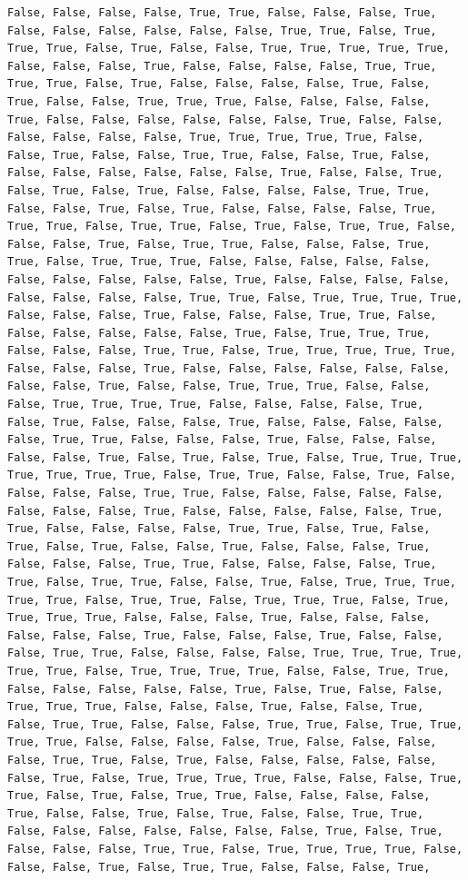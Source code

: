 \documentclass[
  letterpaper,
  DIV=11,
  numbers=noendperiod]{scrartcl}
\begin{document}
\begin{verbatim}
False, False, False, False, True, True, False, False, False, True, False, False, False, False, False, False, True, True, False, True, True, True, False, True, False, False, True, True, True, True, True, False, False, False, True, False, False, False, False, True, True, True, True, False, True, False, False, False, False, True, False, True, False, False, True, True, True, False, False, False, False, True, False, False, False, False, False, False, True, False, False, False, False, False, False, True, True, True, True, True, False, False, True, False, False, True, True, False, False, True, False, False, False, False, False, False, False, True, False, False, True, False, True, False, True, False, False, False, False, True, True, False, False, True, False, True, False, False, False, False, True, True, True, False, True, True, False, True, False, True, True, False, False, False, True, False, True, True, False, False, False, True, True, False, True, True, True, False, False, False, False, False, False, False, False, False, False, True, False, False, False, False, False, False, False, False, True, True, False, True, True, True, True, False, False, False, True, False, False, False, True, True, False, False, False, False, False, False, True, False, True, True, True, False, False, False, True, True, False, True, True, True, True, True, False, False, False, True, False, False, False, False, False, False, False, False, True, False, False, True, True, True, False, False, False, True, True, True, True, False, False, False, False, True, False, True, False, False, False, True, False, False, False, False, False, True, True, False, False, False, True, False, False, False, False, False, True, False, True, False, True, False, True, True, True, True, True, True, True, False, True, True, False, False, True, False, False, False, False, True, True, False, False, False, False, False, False, False, False, True, False, False, False, False, False, True, True, False, False, False, False, True, True, False, True, False, True, False, True, False, False, True, False, False, False, True, False, False, False, True, True, False, False, False, False, True, True, False, True, True, False, False, True, False, True, True, True, True, True, False, True, True, False, True, True, True, False, True, True, True, True, False, False, False, True, False, False, False, False, False, False, True, False, False, False, True, False, False, False, True, True, False, False, False, False, True, True, True, True, True, True, False, True, True, True, True, False, False, True, True, False, False, False, False, False, True, False, True, False, False, True, True, True, False, False, False, True, False, False, True, False, True, True, False, False, False, True, True, False, True, True, True, True, False, False, False, False, True, False, False, False, False, True, True, False, True, False, False, False, False, False, False, True, False, True, True, True, True, False, False, False, True, True, False, True, False, True, True, False, False, False, False, True, False, False, True, False, True, False, False, True, True, False, False, False, False, False, False, False, True, False, True, False, False, False, True, True, False, True, True, True, True, False, False, False, True, False, True, True, False, False, False, True, 
\end{verbatim}
\end{document}
